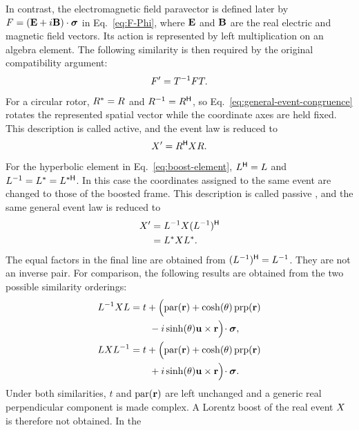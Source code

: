 In contrast, the electromagnetic field paravector is defined later by
\(F=(\mathbf{E}+i\mathbf{B})\cdot\mathbf{\bm{\sigma}}\) in Eq.\ \eqref{eq:F-Phi}, where
\(\mathbf{E}\) and \(\mathbf{B}\) are the real electric and magnetic field
vectors. Its action is represented by left multiplication on an algebra
element. The following similarity is then required by the original
compatibility argument:
\begin{equation}
F'=T^{-1}FT.
\label{eq:general-field-similarity}
\end{equation}
For a circular rotor, \(R^*=R\) and
\(R^{-1}=R^{\mathsf H}\), so Eq.\ \eqref{eq:general-event-congruence}
rotates the represented spatial vector while the coordinate axes are held
fixed. This description is called active, and the event law is reduced to
\begin{equation}
X'=R^{\mathsf H}XR.
\label{eq:rotor}
\end{equation}
For the hyperbolic element in Eq.\ \eqref{eq:boost-element},
\(L^{\mathsf H}=L\) and
\(L^{-1}=L^*=L^{*\mathsf H}\). In this case the coordinates
assigned to the same event are changed to those of the boosted frame. This
description is called passive
\cite{lorentz1904,einstein1905,minkowski1908}, and the same general event law
is reduced to
\begin{align}
X'
&=L^{-1}X(L^{-1})^{\mathsf H}\notag\\
&=L^{*}XL^{*}.
\label{eq:boost}
\end{align}
The equal factors in the final line are obtained from
\((L^{-1})^{\mathsf H}=L^{-1}\). They are not an inverse pair.
For comparison, the following results are obtained from the two possible
similarity orderings:
\begin{align}
L^{-1}XL
&=t+\Bigl(
\operatorname{par}(\mathbf{r})
+\cosh(\theta)\operatorname{prp}(\mathbf{r})\notag\\
&\qquad
-i\sinh(\theta)\mathbf{u}\times\mathbf{r}
\Bigr)\!\cdot\mathbf{\bm{\sigma}},\notag\\
LXL^{-1}
&=t+\Bigl(
\operatorname{par}(\mathbf{r})
+\cosh(\theta)\operatorname{prp}(\mathbf{r})\notag\\
&\qquad
+i\sinh(\theta)\mathbf{u}\times\mathbf{r}
\Bigr)\!\cdot\mathbf{\bm{\sigma}}.
\label{eq:event-boost-similarity-test}
\end{align}
Under both similarities, \(t\) and \(\operatorname{par}(\mathbf{r})\) are left
unchanged and a generic real perpendicular component is made complex. A
Lorentz boost of the real event \(X\) is therefore not obtained. In the
